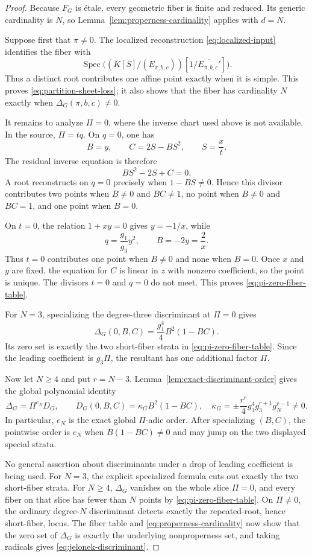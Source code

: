 \begin{proof}
Because \(F_G\) is \'etale, every geometric fiber is finite and reduced.
Its generic cardinality is \(N\), so
Lemma~\ref{lem:properness-cardinality} applies with \(d=N\).

Suppose first that \(\pi\neq0\).  The localized reconstruction
\eqref{eq:localized-input} identifies the fiber with
\[
 \operatorname{Spec}
 \bigl((\overline K[S]/(E_{\pi,b,c}))[1/\overline{E_{\pi,b,c}'}]\bigr).
\]
Thus a distinct root contributes one affine point exactly when it is simple.
This proves \eqref{eq:partition-sheet-loss}; it also shows that the fiber has
cardinality \(N\) exactly when \(\Delta_G(\pi,b,c)\neq0\).

It remains to analyze \(\Pi=0\), where the inverse chart used above is not
available.  In the source, \(\Pi=tq\).  On \(q=0\), one has
\[
 B=y,\qquad C=2S-BS^2,\qquad S=\frac{x}{t}.
\]
The residual inverse equation is therefore
\begin{equation}
 BS^2-2S+C=0.
 \label{eq:q-zero-residual}
\end{equation}
A root reconstructs on \(q=0\) precisely when \(1-BS\neq0\).  Hence this
divisor contributes two points when \(B\neq0\) and \(BC\neq1\), no point when
\(B\neq0\) and \(BC=1\), and one point when \(B=0\).

On \(t=0\), the relation \(1+xy=0\) gives \(y=-1/x\), while
\[
 q=\frac{g_1}{g_3}y^2,\qquad B=-2y=\frac2x.
\]
Thus \(t=0\) contributes one point when \(B\neq0\) and none when \(B=0\).
Once \(x\) and \(y\) are fixed, the equation for \(C\) is linear in \(z\)
with nonzero coefficient, so the point is unique.  The divisors \(t=0\) and
\(q=0\) do not meet.  This proves \eqref{eq:pi-zero-fiber-table}.

For \(N=3\), specializing the degree-three discriminant at \(\Pi=0\) gives
\[
 \Delta_G(0,B,C)=\frac{g_1^4}{4}B^2(1-BC).
\]
Its zero set is exactly the two short-fiber strata in
\eqref{eq:pi-zero-fiber-table}.  Since the leading coefficient is
\(g_3\Pi\), the resultant has one additional factor \(\Pi\).

Now let \(N\geq4\) and put \(r=N-3\).
Lemma~\ref{lem:exact-discriminant-order} gives the global polynomial
identity
\[
 \Delta_G=\Pi^{e_N}D_G,\qquad
 D_G(0,B,C)=\kappa_GB^2(1-BC),
\quad
 \kappa_G=\pm\frac{r^r}{4}
 g_1^4g_3^{r+1}g_N^{r-1}\neq0.
\]
In particular, \(e_N\) is the exact global \(\Pi\)-adic order.  After specializing
\((B,C)\), the pointwise order is \(e_N\) when
\(B(1-BC)\neq0\) and may jump on the two displayed special strata.

No general assertion about discriminants under a drop of leading coefficient
is being used.  For \(N=3\), the explicit specialized formula cuts out
exactly the two short-fiber strata.  For \(N\geq4\), \(\Delta_G\) vanishes on
the whole slice \(\Pi=0\), and every fiber on that slice has fewer than \(N\)
points by \eqref{eq:pi-zero-fiber-table}.  On \(\Pi\neq0\), the ordinary
degree-\(N\) discriminant detects exactly the repeated-root, hence
short-fiber, locus.
The fiber table and \eqref{eq:properness-cardinality} now show that the zero
set of \(\Delta_G\) is exactly the underlying nonproperness set, and taking
radicals gives \eqref{eq:jelonek-discriminant}.
\end{proof}

